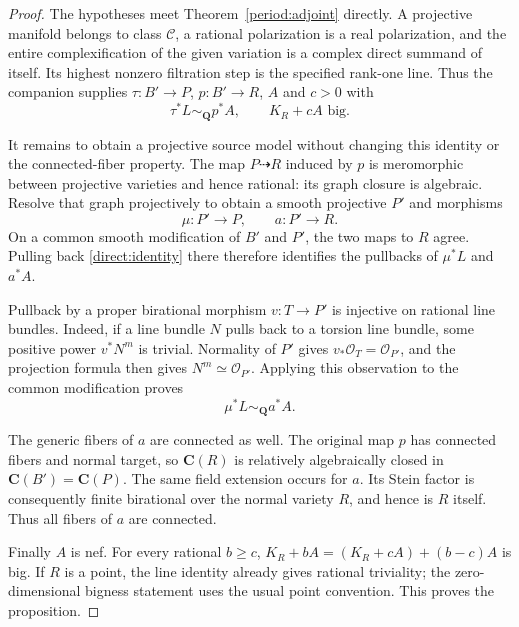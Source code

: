 \begin{proof}
The hypotheses meet Theorem~\ref{period:adjoint} directly. A projective
manifold belongs to class $\mathcal C$, a rational polarization
is a real polarization, and the entire complexification of the
given variation is a complex direct summand of itself. Its
highest nonzero filtration step is the specified rank-one line.
Thus the companion supplies $\tau:B'\to P$, $p:B'\to R$,
$A$ and $c>0$ with
\begin{equation}\label{direct:identity}
                \tau^*L\sim_{\mathbf Q}p^*A,
                \qquad K_R+cA\text{ big}.
\end{equation}

It remains to obtain a projective source model without changing
this identity or the connected-fiber property. The map
$P\dashrightarrow R$ induced by $p$ is meromorphic between
projective varieties and hence rational: its graph closure is
algebraic. Resolve that graph projectively to obtain a smooth
projective $P'$ and morphisms
\[
                       \mu:P'\to P,
                       \qquad a:P'\to R.
\]
On a common smooth modification of $B'$ and $P'$, the two maps
to $R$ agree. Pulling back \eqref{direct:identity} there therefore
identifies the pullbacks of $\mu^*L$ and $a^*A$.

Pullback by a proper birational morphism $v:T\to P'$ is
injective on rational line bundles. Indeed, if a line bundle
$N$ pulls back to a torsion line bundle, some positive power
$v^*N^m$ is trivial. Normality of $P'$ gives
$v_*\mathcal O_T=\mathcal O_{P'}$, and the projection formula
then gives $N^m\simeq\mathcal O_{P'}$. Applying this observation
to the common modification proves
\[
                          \mu^*L\sim_{\mathbf Q}a^*A.
\]

The generic fibers of $a$ are connected as well. The original
map $p$ has connected fibers and normal target, so
$\mathbf C(R)$ is relatively algebraically closed in
$\mathbf C(B')=\mathbf C(P)$. The same field extension occurs
for $a$. Its Stein factor is consequently finite birational
over the normal variety $R$, and hence is $R$ itself. Thus all
fibers of $a$ are connected.

Finally $A$ is nef. For every rational $b\geq c$,
$K_R+bA=(K_R+cA)+(b-c)A$ is big. If $R$ is a point, the line
identity already gives rational triviality; the zero-dimensional
bigness statement uses the usual point convention. This proves
the proposition.
\end{proof}


